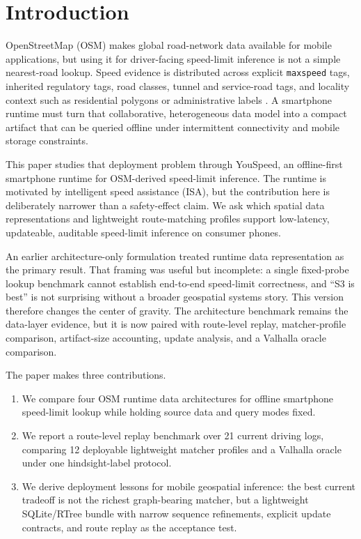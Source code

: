 \documentclass[sigconf]{acmart}
\begin{document}
\maketitle

\section{Introduction}

OpenStreetMap (OSM) makes global road-network data available for mobile applications, but using it for driver-facing speed-limit inference is not a simple nearest-road lookup. Speed evidence is distributed across explicit \texttt{maxspeed} tags, inherited regulatory tags, road classes, tunnel and service-road tags, and locality context such as residential polygons or administrative labels \cite{osmwiki_highways,osmwiki_maxspeed}. A smartphone runtime must turn that collaborative, heterogeneous data model into a compact artifact that can be queried offline under intermittent connectivity and mobile storage constraints.

This paper studies that deployment problem through YouSpeed, an offline-first smartphone runtime for OSM-derived speed-limit inference. The runtime is motivated by intelligent speed assistance (ISA), but the contribution here is deliberately narrower than a safety-effect claim. We ask which spatial data representations and lightweight route-matching profiles support low-latency, updateable, auditable speed-limit inference on consumer phones.

An earlier architecture-only formulation treated runtime data representation as the primary result. That framing was useful but incomplete: a single fixed-probe lookup benchmark cannot establish end-to-end speed-limit correctness, and ``S3 is best'' is not surprising without a broader geospatial systems story. This version therefore changes the center of gravity. The architecture benchmark remains the data-layer evidence, but it is now paired with route-level replay, matcher-profile comparison, artifact-size accounting, update analysis, and a Valhalla oracle comparison.

The paper makes three contributions.

\begin{enumerate}
\item We compare four OSM runtime data architectures for offline smartphone speed-limit lookup while holding source data and query modes fixed.
\item We report a route-level replay benchmark over 21 current driving logs, comparing 12 deployable lightweight matcher profiles and a Valhalla oracle under one hindsight-label protocol.
\item We derive deployment lessons for mobile geospatial inference: the best current tradeoff is not the richest graph-bearing matcher, but a lightweight SQLite/RTree bundle with narrow sequence refinements, explicit update contracts, and route replay as the acceptance test.
\end{enumerate}
\end{document}
